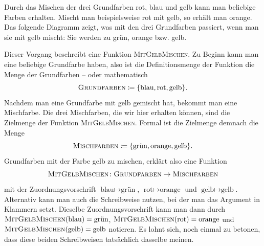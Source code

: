 \documentclass[../../main.tex]{subfiles}
\begin{document}
\begin{example}{}
    Durch das Mischen der drei Grundfarben rot, blau und gelb kann man beliebige Farben erhalten. Mischt man beispielsweise rot mit gelb, so erhält man orange. Das folgende Diagramm zeigt, was mit den drei Grundfarben passiert, wenn man sie mit gelb mischt: Sie werden zu grün, orange bzw. gelb.
    \begin{center}
    \end{center}
    Dieser Vorgang beschreibt eine Funktion \textsc{MitGelbMischen}. Zu Beginn kann man eine beliebige Grundfarbe haben, also ist die Definitionsmenge der Funktion die Menge der Grundfarben -- oder mathematisch \[\textsc{Grundfarben}\coloneqq\{\text{blau},\text{rot},\text{gelb}\}.\]
    Nachdem man eine Grundfarbe mit gelb gemischt hat, bekommt man eine Mischfarbe. Die drei Mischfarben, die wir hier erhalten können, sind die Zielmenge der Funktion \textsc{MitGelbMischen}. Formal ist die Zielmenge demnach die Menge \[\textsc{Mischfarben}\coloneqq\{\text{grün},\text{orange},\text{gelb}\}.\]
    Grundfarben mit der Farbe gelb zu mischen, erklärt also eine Funktion \[\textsc{MitGelbMischen}\colon\textsc{Grundfarben}\rightarrow\textsc{Mischfarben}\] mit der Zuordnungsvorschrift $\text{blau}\mapsto\text{grün}$, $\text{rot}\mapsto\text{orange}$ und $\text{gelb}\mapsto\text{gelb}$. Alternativ kann man auch die Schreibweise nutzen, bei der man das Argument in Klammern setzt. Dieselbe Zuordnungsvorschrift kann man dann durch $\textsc{MitGelbMischen}(\text{blau})=\text{grün}$, $\textsc{MitGelbMischen}(\text{rot})=\text{orange}$ und $\textsc{MitGelbMischen}(\text{gelb})=\text{gelb}$ notieren. Es lohnt sich, noch einmal zu betonen, dass diese beiden Schreibweisen tatsächlich dasselbe meinen.
\end{example}

\end{document}
